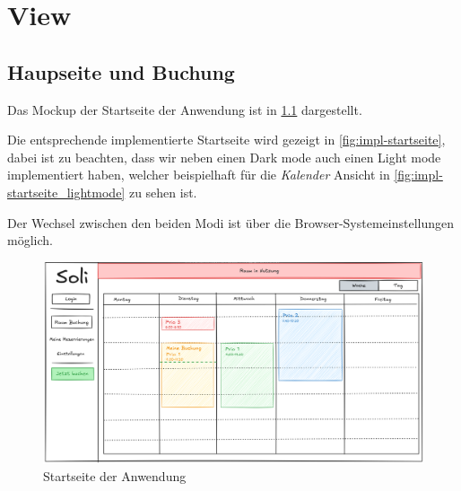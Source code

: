
\chapter{View}
\label{chap:view}


\section{Haupseite und Buchung}

Das Mockup der Startseite der Anwendung ist in \ref{fig:startseite} dargestellt.

Die entsprechende implementierte Startseite wird gezeigt in \ref{fig:impl-startseite},
dabei ist zu beachten, dass wir neben einen Dark mode auch einen Light mode implementiert haben,
welcher beispielhaft für die \textit{Kalender} Ansicht in \ref{fig:impl-startseite_lightmode} zu sehen ist.

Der Wechsel zwischen den beiden Modi ist über die Browser-Systemeinstellungen möglich.

\begin{figure}[ht]
    \centering
    \includegraphics[width=\textwidth]{figures/mockup/calendar}
    \caption{Startseite der Anwendung}
    \label{fig:startseite}
\end{figure}
\pagebreak

